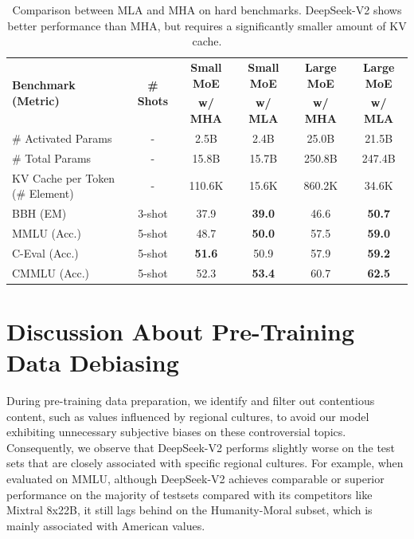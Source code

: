 \documentclass[11pt, a4paper, logo, copyright, nonumbering]{deepseek}
\newcommand{\dsvii}{DeepSeek-V2}
\newcommand{\dsattn}{MLA}
\begin{document}
\begin{CJK*}{UTF8}{gbsn}
\begin{table}[ht]
    \centering
    \setlength{\tabcolsep}{4pt}
    \begin{tabular}{@{}l c | c c | c c@{}}
    \toprule
    \multirow{2}{*}{\centering \textbf{Benchmark (Metric)}} & \multirow{2}{*}{\textbf{\# Shots}} & \textbf{Small MoE} & \textbf{Small MoE} & \textbf{Large MoE} & \textbf{Large MoE} \\
     & & \textbf{w/ MHA} & \textbf{w/ \dsattn{}} & \textbf{w/ MHA} & \textbf{w/ \dsattn{}} \\
    \midrule
    \# Activated Params & - & 2.5B & 2.4B & 25.0B & 21.5B \\
    \# Total Params & - & 15.8B & 15.7B & 250.8B & 247.4B \\
    KV Cache per Token (\# Element) & - & 110.6K & 15.6K & 860.2K & 34.6K \\
    \midrule
    BBH (EM) & 3-shot & 37.9 & \textbf{39.0} & 46.6 & \textbf{50.7} \\
    MMLU (Acc.) & 5-shot & 48.7 & \textbf{50.0} & 57.5 & \textbf{59.0} \\
    C-Eval (Acc.) & 5-shot & \textbf{51.6} & 50.9 & 57.9 & \textbf{59.2} \\
    CMMLU (Acc.) & 5-shot & 52.3 & \textbf{53.4} & 60.7 & \textbf{62.5} \\
    \bottomrule
    \end{tabular}
    \caption{
    Comparison between \dsattn{} and MHA on hard benchmarks. 
    \dsvii{} shows better performance than MHA, but requires a significantly smaller amount of KV cache. 
    }
    \label{tab:dsattn_mha}
\end{table}

\section{Discussion About Pre-Training Data Debiasing}
\label{app:filtering_controversial_content}

During pre-training data preparation, we identify and filter out contentious content, such as values influenced by regional cultures, to avoid our model exhibiting unnecessary subjective biases on these controversial topics.
Consequently, we observe that \dsvii{} performs slightly worse on the test sets that are closely associated with specific regional cultures. 
For example, when evaluated on MMLU, although \dsvii{} achieves comparable or superior performance on the majority of testsets compared with its competitors like Mixtral 8x22B, it still lags behind on the Humanity-Moral subset, which is mainly associated with American values. 


\end{CJK*}
\end{document}
